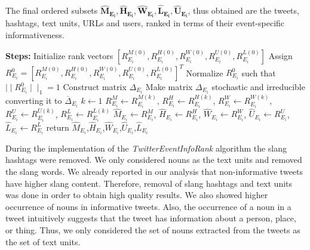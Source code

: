 The final ordered subsets $\scriptstyle \mathbf{\hat{M}_{E_{i}}, \hat{H}_{E_{i}}, \hat{W}_{E_{i}}, \hat{L}_{E_{i}}, \hat{U}_{E_{i}}}$,  thus obtained are the tweets, hashtags, text units, URLs and users, ranked in terms of their event-specific informativeness. 

\begin{algorithm}
\label{algo}
\BlankLine
{}
\BlankLine
\textbf{Steps:}
\BlankLine
Initialize rank vectors $[R_{{E_{i}}}^{M(0)}, R_{{E_{i}}}^{H(0)}, R_{{E_{i}}}^{W(0)}, R_{{E_{i}}}^{U(0)}, R_{{E_{i}}}^{L(0)}]$\;
\BlankLine
Assign $R_{E_{i}}^{0}=[R_{E_{i}}^{M(0)},R_{E_{i}}^{H(0)},R_{E_{i}}^{W(0)},R_{E_{i}}^{U(0)},R_{E_{i}}^{L(0)}]^{T} $\;
\BlankLine
Normalize $R_{E_{i}}^{0}$ such that $\mid \mid R_{E_{i}}^{0}\mid \mid_{1} = 1$ \;
\BlankLine
Construct matrix $\Delta_{E_{i}}$\;
\BlankLine
Make matrix $\Delta_{E_{i}}$ stochastic and irreducible converting it to $\overline \Delta_{E_{i}}$\;
\BlankLine
$k \leftarrow 1$ 
\BlankLine
{}
\BlankLine
$R_{E_{i}}^{M} \leftarrow R_{E_{i}}^{M(k)}$, $R_{E_{i}}^{H} \leftarrow R_{E_{i}}^{H(k)}$, $R_{E_{i}}^{W} \leftarrow R_{E_{i}}^{W(k)}$,  $R_{E_{i}}^{U} \leftarrow R_{E_{i}}^{U(k)}$, $R_{E_{i}}^{L} \leftarrow R_{E_{i}}^{L(k)}$\;
\BlankLine
$\hat{M}_{E_{i}} \leftarrow R_{E_{i}}^{M}$, $\hat{H}_{E_{i}} \leftarrow R_{E_{i}}^{H}$, $\hat{W}_{E_{i}} \leftarrow R_{E_{i}}^{W}$, $\hat{U}_{E_{i}} \leftarrow R_{E_{i}}^{U}$, $\hat{L}_{E_{i}} \leftarrow R_{E_{i}}^{L}$\;
\BlankLine
return $\hat{M}_{E_{i}}$,$\hat{H}_{E_{i}}$,$\hat{W}_{E_{i}}$,$\hat{U}_{E_{i}}$,$\hat{L}_{E_{i}}$\;
\end{algorithm}\DecMargin{1em}

During the implementation of the \textit{TwitterEventInfoRank} algorithm the slang hashtags were removed. We only considered nouns as the text units and removed the slang words. We already reported in our analysis that non-informative tweets have higher slang content. Therefore, removal of slang hashtags and text units was done in order to obtain high quality results. We also showed higher occurrence of nouns in informative tweets. Also, the occurrence of a noun in a tweet intuitively suggests that the tweet has information about a person, place, or thing. Thus, we only considered the set of nouns extracted from the tweets as the set of text units. 

